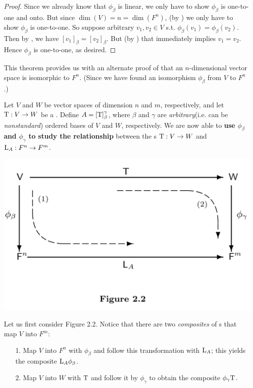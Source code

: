 \begin{proof}
Since we already know that \(\phi_{\beta}\) is linear, we only have to show \(\phi_{\beta}\) is one-to-one and onto.
But since \(\dim(V) = n = \dim(F^n)\), (by ) we only have to show \(\phi_{\beta}\) is one-to-one.
So suppose arbitrary \(v_1, v_2 \in V\) s.t. \(\phi_{\beta}(v_1) = \phi_{\beta}(v_2)\).
Then by , we have \([v_1]_{\beta} = [v_2]_{\beta}\).
But (by ) that immediately implies \(v_1 = v_2\).
Hence \(\phi_{\beta}\) is one-to-one, as desired.
\end{proof}

\begin{remark} \label{remark 2.4.5}
This theorem provides us with an alternate proof of  that an \(n\)-dimensional vector space is isomorphic to \(F^n\).
(Since we have found an isomorphism \(\phi_{\beta}\) from \(V\) to \(F^n\).)
\end{remark}

Let \(V\) and \(W\) be vector spaces of dimension \(n\) and \(m\), respectively, and let \(\mathrm{T} : V \to W\) be a \LTRAN{}.
Define \(A = [\mathrm{T}]_{\beta}^{\gamma}\), where \(\beta\) and \(\gamma\) are \emph{arbitrary}(i.e. can be \emph{nonstandard}) ordered bases of \(V\) and \(W\), respectively.
We are now able to \textbf{use \(\phi_{\beta}\) and \(\phi_{\gamma}\) to study the relationship} between the \LTRAN{}s \(\mathrm{T} : V \to W\) and
\(\mathrm{L}_A: F^n \to F^m\).

\includegraphics[width=16cm]{images/figure-2-2.png}

Let us first consider Figure 2.2.
Notice that there are two \emph{composites} of \LTRAN{}s that map \(V\) into \(F^m\):
\begin{enumerate}
\item[1.] Map \(V\) into \(F^n\) with \(\phi_{\beta}\) and follow this transformation with \(\mathrm{L}_A\);
    this yields the composite \(\mathrm{L}_A \phi_{\beta}\).
\item[2.] Map \(V\) into \(W\) with \(\mathrm{T}\) and follow it by \(\phi_{\gamma}\) to obtain the composite \(\phi_{\gamma} \mathrm{T}\).
\end{enumerate}

